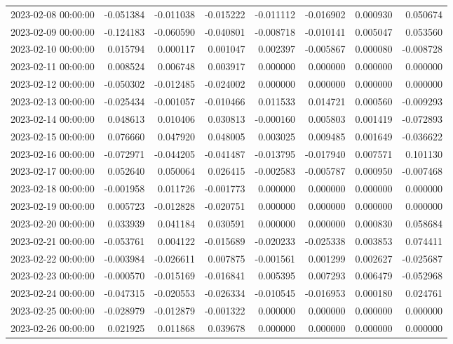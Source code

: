 \begin{tabular}{lrrrrrrr}
2023-02-08 00:00:00 & -0.051384 & -0.011038 & -0.015222 & -0.011112 & -0.016902 & 0.000930 & 0.050674 \\
2023-02-09 00:00:00 & -0.124183 & -0.060590 & -0.040801 & -0.008718 & -0.010141 & 0.005047 & 0.053560 \\
2023-02-10 00:00:00 & 0.015794 & 0.000117 & 0.001047 & 0.002397 & -0.005867 & 0.000080 & -0.008728 \\
2023-02-11 00:00:00 & 0.008524 & 0.006748 & 0.003917 & 0.000000 & 0.000000 & 0.000000 & 0.000000 \\
2023-02-12 00:00:00 & -0.050302 & -0.012485 & -0.024002 & 0.000000 & 0.000000 & 0.000000 & 0.000000 \\
2023-02-13 00:00:00 & -0.025434 & -0.001057 & -0.010466 & 0.011533 & 0.014721 & 0.000560 & -0.009293 \\
2023-02-14 00:00:00 & 0.048613 & 0.010406 & 0.030813 & -0.000160 & 0.005803 & 0.001419 & -0.072893 \\
2023-02-15 00:00:00 & 0.076660 & 0.047920 & 0.048005 & 0.003025 & 0.009485 & 0.001649 & -0.036622 \\
2023-02-16 00:00:00 & -0.072971 & -0.044205 & -0.041487 & -0.013795 & -0.017940 & 0.007571 & 0.101130 \\
2023-02-17 00:00:00 & 0.052640 & 0.050064 & 0.026415 & -0.002583 & -0.005787 & 0.000950 & -0.007468 \\
2023-02-18 00:00:00 & -0.001958 & 0.011726 & -0.001773 & 0.000000 & 0.000000 & 0.000000 & 0.000000 \\
2023-02-19 00:00:00 & 0.005723 & -0.012828 & -0.020751 & 0.000000 & 0.000000 & 0.000000 & 0.000000 \\
2023-02-20 00:00:00 & 0.033939 & 0.041184 & 0.030591 & 0.000000 & 0.000000 & 0.000830 & 0.058684 \\
2023-02-21 00:00:00 & -0.053761 & 0.004122 & -0.015689 & -0.020233 & -0.025338 & 0.003853 & 0.074411 \\
2023-02-22 00:00:00 & -0.003984 & -0.026611 & 0.007875 & -0.001561 & 0.001299 & 0.002627 & -0.025687 \\
2023-02-23 00:00:00 & -0.000570 & -0.015169 & -0.016841 & 0.005395 & 0.007293 & 0.006479 & -0.052968 \\
2023-02-24 00:00:00 & -0.047315 & -0.020553 & -0.026334 & -0.010545 & -0.016953 & 0.000180 & 0.024761 \\
2023-02-25 00:00:00 & -0.028979 & -0.012879 & -0.001322 & 0.000000 & 0.000000 & 0.000000 & 0.000000 \\
2023-02-26 00:00:00 & 0.021925 & 0.011868 & 0.039678 & 0.000000 & 0.000000 & 0.000000 & 0.000000 \\

\end{tabular}

